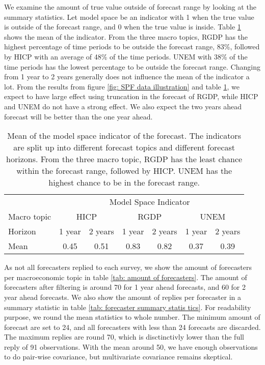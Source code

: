 \documentclass[11pt]{article}
\begin{document}
We examine the amount of true value outside of forecast range by
looking at the summary statistics. Let model space be an indicator with 1
when the true value is outside of the forecast range, and 0 when the
true value is inside. Table \ref{tab: modelspace summary statistics}
shows the mean of the indicator. From the three macro topics, RGDP has the highest percentage of time periods to be outside the forecast range, 83\%, followed by HICP
with an average of 48\% of the time periods. UNEM with 38\% of the time periods has the lowest percentage to be outside the forecast
range. Changing from 1 year to 2 years generally does not influence the
mean of the indicator a lot. From the results from figure
\ref{fig: SPF data illustration} and table
\ref{tab: modelspace summary statistics}, we expect to have large effect
using truncation in the forecast of RGDP, while HICP and UNEM do not
have a strong effect. We also expect the two years ahead forecast will
be better than the one year ahead.

\begin{table}[!h]
\centering
\caption{Mean of the model space indicator of the forecast. The indicators are split up into different forecast topics and different forecast horizons. From the three macro topic, RGDP has the least chance within the forecast range, followed by HICP. UNEM has the highest chance to be in the forecast range.}
\label{tab: modelspace summary statistics}
\begin{tabular}{lcccccc}
\hline
&\multicolumn{6}{c}{Model Space Indicator}\\
\cmidrule(lr){2-7}
Macro topic & \multicolumn{2}{c}{HICP} & \multicolumn{2}{c}{RGDP} & \multicolumn{2}{c}{UNEM} \\
\cmidrule(lr){2-3} \cmidrule(lr){4-5}\cmidrule(lr){6-7}
Horizon     & 1 year & 2 years & 1 year & 2 years & 1 year & 2 years \\ 
\hline
Mean        & 0.45        & 0.51         & 0.83        & 0.82        & 0.37         & 0.39       \\
\hline
\end{tabular}
\end{table}

As not all forecasters replied to each survey, we show the amount of forecasters per macroeconomic topic in table \ref{tab: amount of forecasters}. The amount of forecasters after filtering is around 70 for 1 year ahead forecasts, and 60 for 2 year ahead forecasts. We also show the amount of replies per forecaster in a summary statistic in table \ref{tab: forecaster summary statis	tics}. For readability purpose, we round the mean statistics to whole number. The minimum amount of forecast are set to 24, and all forecasters with less than 24 forecasts are discarded. The maximum replies are round 70, which is disctinctivly lower than the full reply of 91 observations. With the mean around 50, we have enough observations to do pair-wise covariance, but multivariate covariance remains skeptical.
\end{document}
